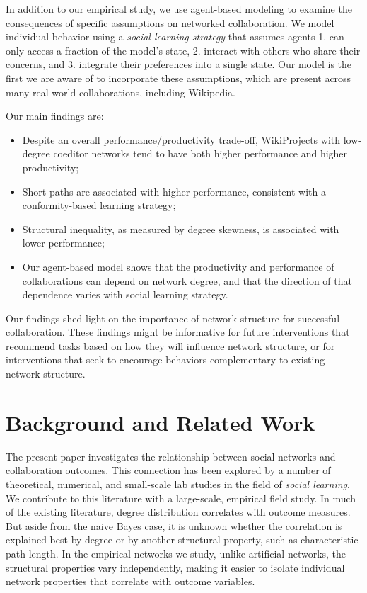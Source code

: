 In addition to our empirical study,
we use agent-based modeling to examine the consequences of specific
assumptions on networked collaboration.
We model individual behavior using a {\em social learning strategy} that
assumes agents 1. can only access a fraction of the model's state,
2. interact with others who share their concerns,
and 3. integrate their preferences into a single state.
Our model is the first we are aware of to incorporate these assumptions,
which are present across many real-world collaborations,
including Wikipedia.
\pagebreak

Our main findings are:
\begin{itemize}
\setlength\itemsep{0pt}
\item Despite an overall performance/productivity trade-off,
WikiProjects with low-degree coeditor networks tend to have both higher performance and higher productivity;
\item Short paths are associated with higher performance, consistent with a conformity-based learning strategy;
\item Structural inequality, as measured by degree skewness, is associated with lower performance;
\item Our agent-based model
shows that the productivity and performance of collaborations can
depend on network degree,
and that the direction of that dependence varies with social learning strategy.
\end{itemize}

Our findings shed light on the importance of network structure for successful
collaboration.
These findings might be informative for future interventions that
recommend tasks based on how they will
influence network structure,
or for interventions that seek to encourage behaviors
complementary to existing network structure.

\section{Background and Related Work}
\label{sec:background}
The present paper investigates the relationship between social networks
and collaboration outcomes.
This connection has been explored by a number of theoretical,
numerical, and small-scale lab studies in the field of
{\em social learning}.
We contribute to this literature with a large-scale, empirical field study.
In much of the existing literature,
degree distribution correlates with outcome measures.
But aside from the naive Bayes case, it is unknown whether
the correlation is explained best by degree or by another structural property, such as characteristic path length.
In the empirical networks we study,
unlike artificial networks,
the structural properties vary independently,
making it easier to isolate individual
network properties that correlate with outcome variables.

